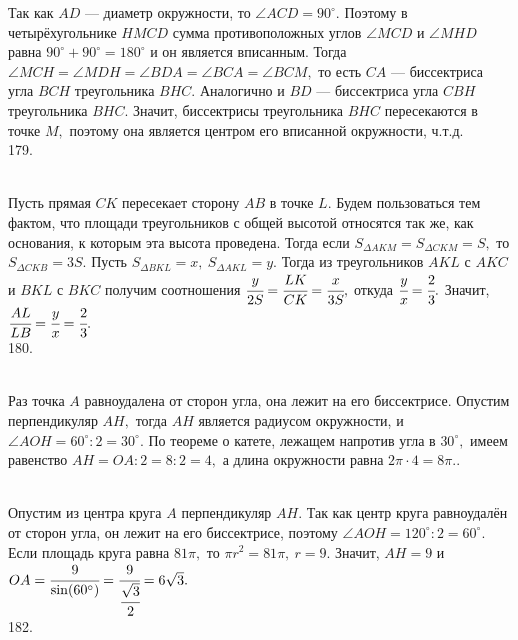 Так как $AD$ --- диаметр окружности, то $ \angle ACD = 90^\circ.$ Поэтому в четырёхугольнике $HMCD$ сумма противоположных углов $\angle MCD$ и $\angle MHD$ равна $90^\circ+90^\circ=180^\circ$ и он является вписанным. Тогда $\angle MCH = \angle MDH = \angle BDA =  \angle BCA =  \angle BCM,$
то есть $CA$ --- биссектриса угла $BCH$ треугольника $BHC.$
Аналогично и $BD$ --- биссектриса угла $CBH$ треугольника $BHC.$ Значит, биссектрисы треугольника $BHC$ пересекаются в точке $M,$ поэтому она является центром его вписанной окружности, ч.т.д.\\
179. \begin{figure}[ht!]
\end{figure}\\
Пусть прямая $CK$ пересекает сторону $AB$ в точке $L.$ Будем пользоваться тем фактом, что площади треугольников с общей высотой относятся так же, как основания, к которым эта высота проведена. Тогда если $S_{\Delta AKM}=S_{\Delta CKM}=S,$ то $S_{\Delta CKB}=3S.$ Пусть $S_{\Delta BKL}=x,\ S_{\Delta AKL}=y.$ Тогда из треугольников $AKL$ с $AKC$ и $BKL$ с $BKC$ получим соотношения $\cfrac{y}{2S}=\cfrac{LK}{CK}=\cfrac{x}{3S},$ откуда $\cfrac{y}{x}=\cfrac{2}{3}.$ Значит, $\cfrac{AL}{LB}=\cfrac{y}{x}=\cfrac{2}{3}.$\\
180. \begin{figure}[ht!]
\end{figure}\\
Раз точка $A$ равноудалена от сторон угла, она лежит на его биссектрисе. Опустим перпендикуляр $AH,$ тогда $AH$ является радиусом окружности, и $\angle AOH=60^\circ:2=30^\circ.$ По теореме о катете, лежащем напротив угла в $30^\circ,$ имеем равенство $AH=OA:2=8:2=4,$ а длина окружности равна $2\pi\cdot4=8\pi.$\newpage{}. \begin{figure}[ht!]
\end{figure}\\
Опустим из центра круга $A$ перпендикуляр $AH.$ Так как центр круга равноудалён от сторон угла, он лежит на его биссектрисе, поэтому $\angle AOH=120^\circ:2=60^\circ.$ Если площадь круга равна $81\pi,$ то $\pi r^2=81\pi,\ r=9.$ Значит, $AH=9$ и $OA=\cfrac{9}{\sin(60^\circ)}=\cfrac{9}{\cfrac{\sqrt{3}}{2}}=6\sqrt{3}.$\\
182. \begin{figure}[ht!]
\end{figure}\\
